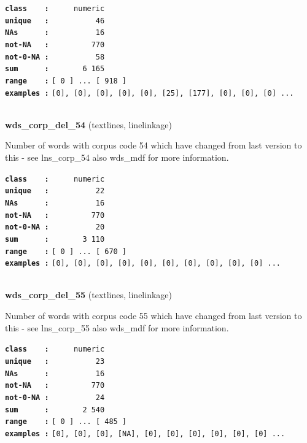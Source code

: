 \documentclass[]{article}
\begin{document}
\textbf{\texttt{class\ \ \ \ :}} \texttt{~~~~~numeric}\\
\textbf{\texttt{unique\ \ \ :}} \texttt{~~~~~~~~~~46}\\
\textbf{\texttt{NAs\ \ \ \ \ \ :}} \texttt{~~~~~~~~~~16}\\
\textbf{\texttt{not-NA\ \ \ :}} \texttt{~~~~~~~~~770}\\
\textbf{\texttt{not-0-NA\ :}} \texttt{~~~~~~~~~~58}\\
\textbf{\texttt{sum\ \ \ \ \ \ :}} \texttt{~~~~~~~6~165}\\
\textbf{\texttt{range\ \ \ \ :}}
\texttt{{[}\ 0\ {]}\ ...\ {[}\ 918\ {]}}\\
\textbf{\texttt{examples\ :}}
\texttt{{[}0{]},\ {[}0{]},\ {[}0{]},\ {[}0{]},\ {[}0{]},\ {[}25{]},\ {[}177{]},\ {[}0{]},\ {[}0{]},\ {[}0{]}\ ...}\\

~

\textbf{wds\_corp\_del\_54} (textlines, linelinkage)

Number of words with corpus code 54 which have changed from last version
to this - see lns\_corp\_54 also wds\_mdf for more information.

\textbf{\texttt{class\ \ \ \ :}} \texttt{~~~~~numeric}\\
\textbf{\texttt{unique\ \ \ :}} \texttt{~~~~~~~~~~22}\\
\textbf{\texttt{NAs\ \ \ \ \ \ :}} \texttt{~~~~~~~~~~16}\\
\textbf{\texttt{not-NA\ \ \ :}} \texttt{~~~~~~~~~770}\\
\textbf{\texttt{not-0-NA\ :}} \texttt{~~~~~~~~~~20}\\
\textbf{\texttt{sum\ \ \ \ \ \ :}} \texttt{~~~~~~~3~110}\\
\textbf{\texttt{range\ \ \ \ :}}
\texttt{{[}\ 0\ {]}\ ...\ {[}\ 670\ {]}}\\
\textbf{\texttt{examples\ :}}
\texttt{{[}0{]},\ {[}0{]},\ {[}0{]},\ {[}0{]},\ {[}0{]},\ {[}0{]},\ {[}0{]},\ {[}0{]},\ {[}0{]},\ {[}0{]}\ ...}\\

~

\textbf{wds\_corp\_del\_55} (textlines, linelinkage)

Number of words with corpus code 55 which have changed from last version
to this - see lns\_corp\_55 also wds\_mdf for more information.

\textbf{\texttt{class\ \ \ \ :}} \texttt{~~~~~numeric}\\
\textbf{\texttt{unique\ \ \ :}} \texttt{~~~~~~~~~~23}\\
\textbf{\texttt{NAs\ \ \ \ \ \ :}} \texttt{~~~~~~~~~~16}\\
\textbf{\texttt{not-NA\ \ \ :}} \texttt{~~~~~~~~~770}\\
\textbf{\texttt{not-0-NA\ :}} \texttt{~~~~~~~~~~24}\\
\textbf{\texttt{sum\ \ \ \ \ \ :}} \texttt{~~~~~~~2~540}\\
\textbf{\texttt{range\ \ \ \ :}}
\texttt{{[}\ 0\ {]}\ ...\ {[}\ 485\ {]}}\\
\textbf{\texttt{examples\ :}}
\texttt{{[}0{]},\ {[}0{]},\ {[}0{]},\ {[}NA{]},\ {[}0{]},\ {[}0{]},\ {[}0{]},\ {[}0{]},\ {[}0{]},\ {[}0{]}\ ...}\\
\end{document}
